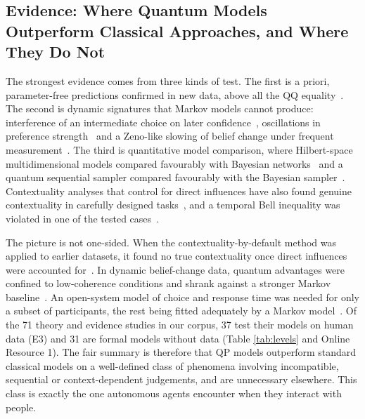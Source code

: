 \documentclass[pdflatex,sn-basic]{sn-jnl}
\begin{document}
\subsection{Evidence: Where Quantum Models Outperform Classical Approaches, and Where They Do Not}\label{sec:evidence}
The strongest evidence comes from three kinds of test. The first is a priori, parameter-free predictions confirmed in new data, above all the QQ equality~\citep{Wang2014}. The second is dynamic signatures that Markov models cannot produce: interference of an intermediate choice on later confidence~\citep{Kvam2015}, oscillations in preference strength~\citep{Kvam2021} and a Zeno-like slowing of belief change under frequent measurement~\citep{Yearsley2016b}. The third is quantitative model comparison, where Hilbert-space multidimensional models compared favourably with Bayesian networks~\citep{Busemeyer2018} and a quantum sequential sampler compared favourably with the Bayesian sampler~\citep{Huang2025a}. Contextuality analyses that control for direct influences have also found genuine contextuality in carefully designed tasks~\citep{Cervantes2018,Basieva2019}, and a temporal Bell inequality was violated in one of the tested cases~\citep{Waddup2023}.

The picture is not one-sided. When the contextuality-by-default method was applied to earlier datasets, it found no true contextuality once direct influences were accounted for~\citep{Dzhafarov2016b}. In dynamic belief-change data, quantum advantages were confined to low-coherence conditions and shrank against a stronger Markov baseline~\citep{Busemeyer2019}. An open-system model of choice and response time was needed for only a subset of participants, the rest being fitted adequately by a Markov model~\citep{Epping2023}. Of the 71 theory and evidence studies in our corpus, 37 test their models on human data (E3) and 31 are formal models without data (Table \ref{tab:levels} and Online Resource 1). The fair summary is therefore that QP models outperform standard classical models on a well-defined class of phenomena involving incompatible, sequential or context-dependent judgements, and are unnecessary elsewhere. This class is exactly the one autonomous agents encounter when they interact with people.


\end{document}
